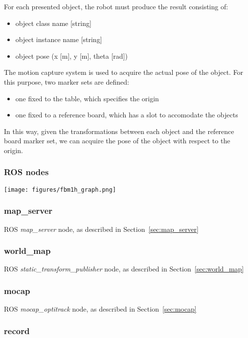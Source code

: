 \documentclass[a4paper]{article}
\begin{document}
For each presented object, the robot must produce the result consisting of:
\begin{itemize}
  \item object class name [string]
  \item object instance name [string]
  \item object pose (x [m], y [m], theta [rad])
\end{itemize}

The motion capture system is used to acquire the actual pose of the object.
For this purpose, two marker sets are defined:

\begin{itemize}
  \item one fixed to the table, which specifies the origin
  \item one fixed to a reference board, which has a slot to accomodate the objects
\end{itemize}

In this way, given the transformations between each object and the reference board marker set, we can acquire the pose of the object with respect to the origin.

\subsubsection{ROS nodes}

\texttt{[image: figures/fbm1h\_graph.png]}

\subsubsection{map\_server}

ROS \emph{map\_server} node, as described in Section~\ref{sec:map_server}

\subsubsection{world\_map}

ROS \emph{static\_transform\_publisher} node, as described in Section~\ref{sec:world_map}
 
\subsubsection{mocap}

ROS \emph{mocap\_optitrack} node, as described in Section~\ref{sec:mocap}

\subsubsection{record}
\end{document}
